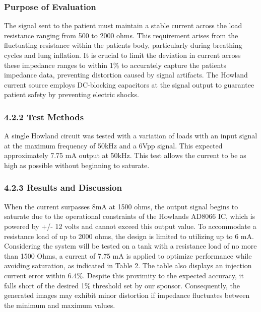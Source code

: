 \documentclass[12pt]{article}
\begin{document}
\subsubsection{Purpose of Evaluation}\label{purpose-of-evaluation}

The signal sent to the patient must maintain a stable current across the
load resistance ranging from 500 to 2000 ohms. This requirement arises
from the fluctuating resistance within the patient\textquotesingle s
body, particularly during breathing cycles and lung inflation. It is
crucial to limit the deviation in current across these impedance ranges
to within 1\% to accurately capture the patient\textquotesingle s
impedance data, preventing distortion caused by signal artifacts. The
Howland current source employs DC-blocking capacitors at the signal
output to guarantee patient safety by preventing electric
shocks.

\subsubsection{4.2.2 Test Methods}\label{test-methods}

A single Howland circuit was tested with a variation of loads with an
input signal at the maximum frequency of 50kHz and a 6Vpp signal. This
expected approximately 7.75 mA output at 50kHz. This test allows the
current to be as high as possible without beginning to saturate.

\subsubsection{4.2.3 Results and Discussion}\label{results-and-discussion}

When the current surpasses 8mA at 1500 ohms, the output signal begins to
saturate due to the operational constraints of the Howlands AD8066 IC,
which is powered by +/- 12 volts and cannot exceed this output value. To
accommodate a resistance load of up to 2000 ohms, the design is limited
to utilizing up to 6 mA. Considering the system will be tested on a tank
with a resistance load of no more than 1500 Ohms, a current of 7.75 mA
is applied to optimize performance while avoiding saturation, as
indicated in Table 2. The table also displays an injection current error
within 6.4\%. Despite this proximity to the expected accuracy, it falls
short of the desired 1\% threshold set by our sponsor. Consequently, the
generated images may exhibit minor distortion if impedance fluctuates
between the minimum and maximum values.
\end{document}
